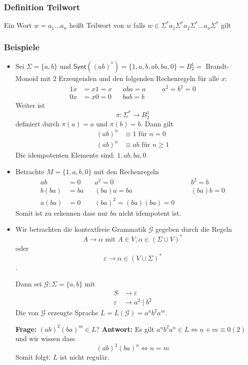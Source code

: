\documentclass[12pt, german]{article}
\newcommand{\sigstern}{\Sigma^\ast}
\newcommand{\synt}{\mathsf{Synt}}
\begin{document}
\subsubsection{Definition Teilwort}
	Ein Wort $w = a_1 \ldots a_n$ heißt Teilwort von $w$ falls $w \in \sigstern a_1 \sigstern a_2 \sigstern \ldots a_n\sigstern$ gilt
	
\subsubsection{Beispiele} 
	\begin{itemize}
		\item Sei $\Sigma = \{a, b\}$ und $\synt((ab)^\ast) = \{1, a ,b , ab, ba, 0\} = B^1_2 =$ Brandt-Monoid mit $2$ Erzeugenden und den folgenden Rechenregeln für alle $x$: 
		\begin{align*}
			1x &= x1 = x   &&aba = a  &&&a^2=b^2 = 0\\
			0x &= x0 = 0   &&bab = b 
		\end{align*}
		Weiter ist $$\pi: \sigstern \to B^1_2$$ definiert durch $\pi(a) = a$ und $\pi(b) = b$. Dann gilt 
		\begin{align*}
			(ab)^n &\equiv 1 \text{ für } n = 0 \\
			(ab)^n &\equiv ab \text{ für } n \geq 1 
		\end{align*} Die idempotenten Elemente sind: $1, ab ,ba, 0$
		\item Betrachte $M = \{1, a, b, 0\}$ mit den Rechenregeln 
		\begin{align*}
			ab &= 0    && a^2 = 0 &&&b^2 = b \\
			b(ba) &= ba   &&(ba)a = ba &&& (ba)b = 0 \\
			a(ba) &= 0  &&(ba)^2 = (ba)(ba) = 0
		\end{align*}
		Somit ist zu erkennen dass nur $ba$ nicht idempotent ist. 
		\item Wir betrachten die kontextfreie Grammatik $\mathscr{G}$ gegeben durch die Regeln $$A \to \alpha \text{ mit } A \in V, \alpha \in (\Sigma \cup V)^\ast$$ oder $$\varepsilon \to \alpha \in (V \cup \Sigma)^\ast$$. 
		
		Dann sei $\mathscr{G}: \Sigma = \{a, b\}$ mit 
		\begin{align*}
			S &\to \varepsilon \\ 
			\varepsilon &\to a^2 \mid b^2 
		\end{align*} 
		Die von $\mathscr{G}$ erzeugte Sprache $L = L(\mathscr{G}) = a^nb^2a^m$. \\ 
		\newline
		
		\textbf{Frage:} $(ab)^2(ba)^m \in L$? 
		\newline
		\textbf{Antwort:} Es gilt $a^nb^2a^n \in L \iff n+m \equiv 0 (2)$ und wir wissen dass $$(ab)^2(ba)^n \iff n = m$$ Somit folgt: $L$ ist nicht regulär.
	\end{itemize}
	
\end{document}
